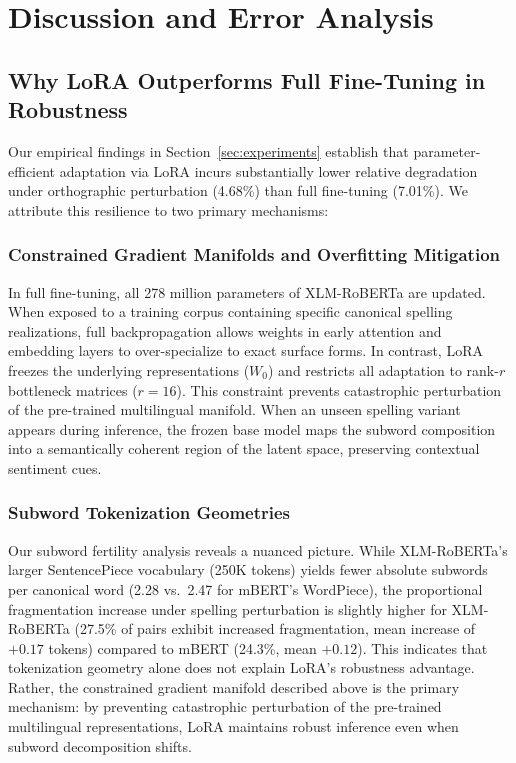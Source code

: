 \section{Discussion and Error Analysis}
\label{sec:discussion}

\subsection{Why LoRA Outperforms Full Fine-Tuning in Robustness}
Our empirical findings in Section~\ref{sec:experiments} establish that parameter-efficient adaptation via LoRA incurs substantially lower relative degradation under orthographic perturbation (4.68\%) than full fine-tuning (7.01\%). We attribute this resilience to two primary mechanisms:

\subsubsection{Constrained Gradient Manifolds and Overfitting Mitigation}
In full fine-tuning, all 278 million parameters of XLM-RoBERTa are updated. When exposed to a training corpus containing specific canonical spelling realizations, full backpropagation allows weights in early attention and embedding layers to over-specialize to exact surface forms. In contrast, LoRA freezes the underlying representations ($W_0$) and restricts all adaptation to rank-$r$ bottleneck matrices ($r=16$). This constraint prevents catastrophic perturbation of the pre-trained multilingual manifold. When an unseen spelling variant appears during inference, the frozen base model maps the subword composition into a semantically coherent region of the latent space, preserving contextual sentiment cues.

\subsubsection{Subword Tokenization Geometries}
Our subword fertility analysis reveals a nuanced picture. While XLM-RoBERTa's larger SentencePiece vocabulary (250K tokens) yields fewer absolute subwords per canonical word (2.28 vs.\ 2.47 for mBERT's WordPiece), the proportional fragmentation increase under spelling perturbation is slightly higher for XLM-RoBERTa (27.5\% of pairs exhibit increased fragmentation, mean increase of $+0.17$ tokens) compared to mBERT (24.3\%, mean $+0.12$). This indicates that tokenization geometry alone does not explain LoRA's robustness advantage. Rather, the constrained gradient manifold described above is the primary mechanism: by preventing catastrophic perturbation of the pre-trained multilingual representations, LoRA maintains robust inference even when subword decomposition shifts.

